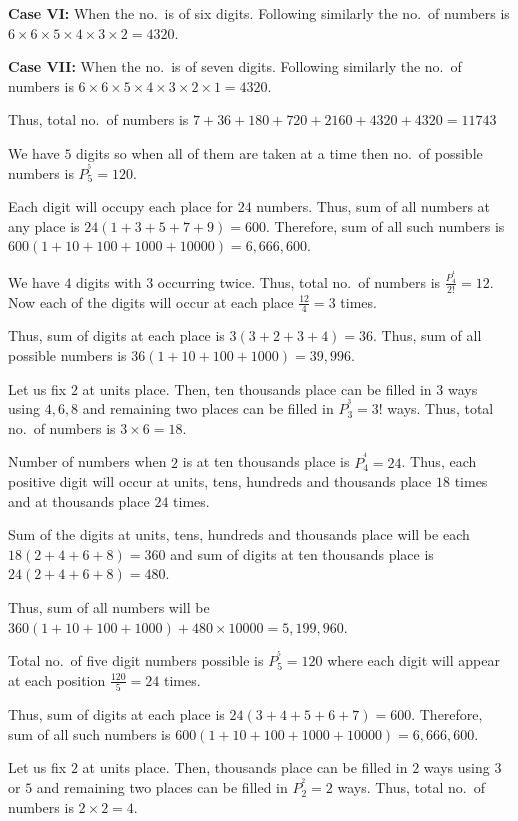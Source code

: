   {\bf Case VI:} When the no.\ is of six digits. Following similarly the no.\ of numbers is
  $6\times6\times5\times4\times3\times2 = 4320$.

  {\bf Case VII:} When the no.\ is of seven digits. Following similarly the no.\ of numbers is
  $6\times6\times5\times4\times3\times2\times1 = 4320$.

  Thus, total no.\ of numbers is $7 + 36 + 180 + 720 + 2160 + 4320 + 4320 = 11743$
\item We have $5$ digits so when all of them are taken at a time then no.\ of possible numbers is $P_5^^5 = 120$.

  Each digit will occupy each place for $24$ numbers. Thus, sum of all numbers at any place is $24(1 + 3 + 5
  + 7 + 9) = 600$. Therefore, sum of all such numbers is $600(1 + 10 + 100 + 1000 + 10000) = 6,666,600$.
\item We have $4$ digits with $3$ occurring twice. Thus, total no.\ of numbers is $\frac{P_4^^4}{2!} =
  12$. Now each of the digits will occur at each place $\frac{12}{4} = 3$ times.

  Thus, sum of digits at each place is $3(3 + 2 + 3 + 4) = 36$. Thus, sum of all possible numbers is $36(1 +
  10 + 100 + 1000) = 39,996$.
\item Let us fix $2$ at units place. Then, ten thousands place can be filled in $3$ ways using $4, 6, 8$ and
  remaining two places can be filled in $P_3^^3 = 3!$ ways. Thus, total no.\ of numbers is $3\times6 = 18$.

  Number of numbers when $2$ is at ten thousands place is $P_4^^4 = 24$. Thus, each positive digit will
  occur at units, tens, hundreds and thousands place $18$ times and at thousands place $24$ times.

  Sum of the digits at units, tens, hundreds and thousands place will be each $18(2 + 4 + 6 + 8) = 360$ and
  sum of digits at ten thousands place is $24(2 + 4 + 6 + 8) = 480$.

  Thus, sum of all numbers will be $360(1 + 10 + 100 + 1000) + 480\times10000 = 5,199,960$.
\item Total no.\ of five digit numbers possible is $P_5^^5 = 120$ where each digit will appear at each
  position $\frac{120}{5} = 24$ times.

  Thus, sum of digits at each place is $24(3 + 4 + 5 + 6 + 7) = 600$. Therefore, sum of all such numbers is
  $600(1 + 10 + 100 + 1000 + 10000) = 6,666,600$.
\item Let us fix $2$ at units place. Then, thousands place can be filled in $2$ ways using $3$ or $5$ and
  remaining two places can be filled in $P_2^^2 = 2$ ways. Thus, total no.\ of numbers is $2\times 2 = 4$.

